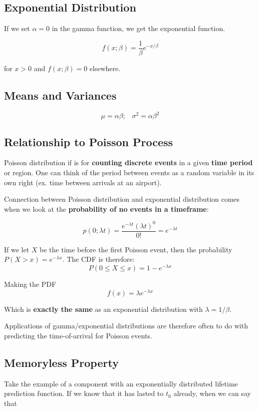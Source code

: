 \documentclass[a4paper,12pt]{report}
\begin{document}
\subsection{Exponential Distribution}

If we set $\alpha = 0$ in the gamma function, we get the exponential function.

$$f(x; \beta) = \frac{1}{\beta} e^{-x/\beta}$$

for $x > 0$ and $f(x; \beta) = 0$ elsewhere.

\subsection{Means and Variances}

$$\mu = \alpha\beta; \,\,\,\,\, \sigma^2 = \alpha\beta^2$$


\subsection{Relationship to Poisson Process}

Poisson distribution if is for \textbf{counting discrete events} in a given \textbf{time period} or region. One can think of the period between events as a random variable in its own right (ex. time between arrivals at an airport). 

Connection between Poisson distribution and exponential distribution comes when we look at the \textbf{probability of no events in a timeframe}:

$$p(0; \lambda t) = \frac{e^{-\lambda t} (\lambda t)^0}{0!} = e^{-\lambda t}$$

If we let $X$ be the time before the first Poisson event, then the probability $P(X > x) = e^{-\lambda x}$. The CDF is therefore: $$P(0 \leq X \leq x) = 1-e^{-\lambda x}$$

Making the PDF $$f(x) = \lambda e^{-\lambda x}$$

Which is \textbf{exactly the same} as an exponential distribution with $\lambda = 1/\beta$. 

Applications of gamma/exponential distributions are therefore often to do with predicting the time-of-arrival for Poisson events.

\subsection{Memoryless Property}

Take the example of a component with an exponentially distributed lifetime prediction function. If we know that it has lasted to $t_0$ already, when we can say that 
\end{document}
